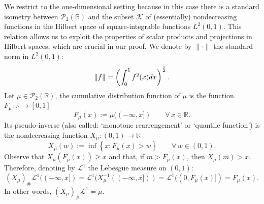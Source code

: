 \documentclass[12pt,a4paper]{article}
\newcommand{\R}{\mathbb{R}}
\renewcommand{\P}{\mathcal{P}}
\renewcommand{\d}{{\rm d}}
\newcommand{\K}{\mathcal{K}}
\theoremstyle{plain}
\theoremstyle{definition}
\begin{document}
We restrict to the one-dimensional setting because in this case there is a standard isometry between $\P_2(\R)$ and the subset $\K$ of (essentially) nondecreasing functions in the Hilbert space of square-integrable functions $L^2(0,1)$. This relation allows us to exploit the properties of scalar products and projections in Hilbert spaces, which are crucial in our proof. We denote by $\| \cdot \|$ the standard norm in $L^2(0,1)$:
\[
	\|f\|=\left(\int_0^1 f^2(x)\d x \right)^{\frac 12}.
\]
Let $\mu\in \P_2(\R)$, the cumulative distribution function of $\mu$ is the function $F_\mu:\R \to [0,1]$
\[
		F_\mu(x):= \mu((-\infty,x])\qquad \forall\,x\in \R.
\]
Its pseudo-inverse (also called: `monotone rearrengement' or `quantile function') is the nondecreasing function $X_\mu: (0,1)\to \R$
\[
	X_\mu(w):=\inf \left\{ x: F_\mu(x)>w \right\}\qquad \forall\,w\in (0,1).
\]
Observe that $X_\mu(F_\mu(x))\geq x$ and that, if $m> F_\mu(x)$, then $X_\mu(m)> x$. Therefore, denoting by $\mathcal{L}^1$ the Lebesgue measure on $(0,1)$:
\[
    (X_{\mu})_\#\mathcal{L}^1 ((-\infty,x]) = \mathcal{L}^1 (X_\mu^{-1}((-\infty,x])) = \mathcal{L}^1((0, F_{\mu}(x)]) = F_\mu(x).
\]
In other words, $(X_{\mu})_\#\mathcal{L}^1 = \mu$.
\end{document}
